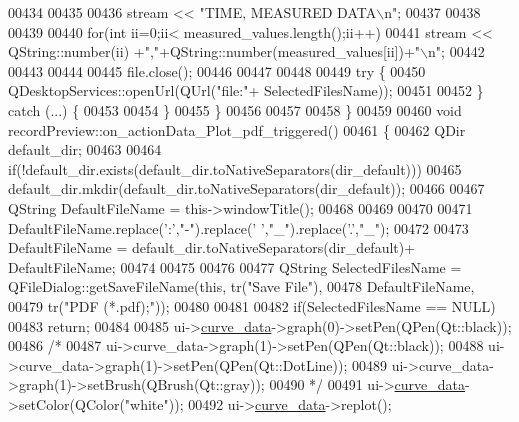 \begin{DoxyCode}
00434 
00435 
00436         stream << \textcolor{stringliteral}{"TIME, MEASURED DATA\(\backslash\)n"};
00437 
00438 
00439 
00440         \textcolor{keywordflow}{for}(\textcolor{keywordtype}{int} ii=0;ii< measured\_values.length();ii++)
00441            stream << QString::number(ii) +\textcolor{stringliteral}{","}+QString::number(measured\_values[ii])+\textcolor{stringliteral}{"\(\backslash\)n"};
00442 
00443 
00444 
00445         file.close();
00446 
00447 
00448 
00449         \textcolor{keywordflow}{try} \{
00450             QDesktopServices::openUrl(QUrl(\textcolor{stringliteral}{"file:"}+ SelectedFilesName));
00451 
00452         \} \textcolor{keywordflow}{catch} (...) \{
00453 
00454         \}
00455     \}
00456 
00457 
00458 \}
00459 
00460 \textcolor{keywordtype}{void} recordPreview::on\_actionData\_Plot\_pdf\_triggered()
00461 \{
00462     QDir default\_dir;
00463 
00464     \textcolor{keywordflow}{if}(!default\_dir.exists(default\_dir.toNativeSeparators(dir\_default)))
00465         default\_dir.mkdir(default\_dir.toNativeSeparators(dir\_default));
00466 
00467     QString DefaultFileName = this->windowTitle();
00468 
00469 
00470 
00471     DefaultFileName.replace(\textcolor{charliteral}{':'},\textcolor{stringliteral}{"-"}).replace(\textcolor{charliteral}{' '},\textcolor{stringliteral}{"\_"}).replace(\textcolor{charliteral}{'.'},\textcolor{stringliteral}{"\_"});
00472 
00473     DefaultFileName = default\_dir.toNativeSeparators(dir\_default)+ DefaultFileName;
00474 
00475 
00476 
00477     QString SelectedFilesName = QFileDialog::getSaveFileName(\textcolor{keyword}{this}, tr(\textcolor{stringliteral}{"Save File"}),
00478                                                         DefaultFileName,
00479                                                          tr(\textcolor{stringliteral}{"PDF (*.pdf);"}));
00480 
00481 
00482     \textcolor{keywordflow}{if}(SelectedFilesName == NULL)
00483         \textcolor{keywordflow}{return};
00484 
00485     ui->\hyperlink{a00081_a247d94481323c0bc4f8b6458a8a535dd}{curve\_data}->graph(0)->setPen(QPen(Qt::black));
00486     \textcolor{comment}{/*}
00487 \textcolor{comment}{    ui->curve\_data->graph(1)->setPen(QPen(Qt::black));}
00488 \textcolor{comment}{    ui->curve\_data->graph(1)->setPen(QPen(Qt::DotLine));}
00489 \textcolor{comment}{    ui->curve\_data->graph(1)->setBrush(QBrush(Qt::gray));}
00490 \textcolor{comment}{    */}
00491     ui->\hyperlink{a00081_a247d94481323c0bc4f8b6458a8a535dd}{curve\_data}->setColor(QColor(\textcolor{stringliteral}{"white"}));
00492     ui->\hyperlink{a00081_a247d94481323c0bc4f8b6458a8a535dd}{curve\_data}->replot();

\end{DoxyCode}
